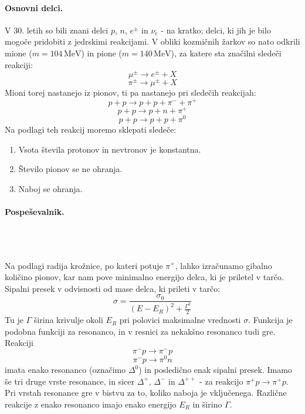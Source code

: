 \documentclass[a4paper]{article}
\newcommand{\vct}[1]{\overrightarrow{#1}}
\begin{document}
\paragraph{Osnovni delci.} V 30. letih so bili znani delci \(p\), \(n\), \(e^\pm\) in \(\nu_e\) - na kratko; delci, ki jih je bilo mogoče pridobiti z jedrskimi reakcijami.
V obliki kozmičnih žarkov so nato odkrili mione (\(m = 104\,\mathrm{MeV}\)) in pione (\(m = 140\,\mathrm{MeV}\)), za katere sta značilni sledeči reakciji:
\[\mu^\pm \to e^\pm + X\]
\[\pi^\pm \to \mu^\pm + X\]
Mioni torej nastanejo iz pionov, ti pa nastanejo pri sledečih reakcijah:
\[p + p \to p + p + \pi^- + \pi^+\]
\[p + p \to p + n + \pi^+\]
\[p + p \to p + p + \pi^0\]
Na podlagi teh reakcij moremo sklepati sledeče:
\begin{enumerate}
    \item Vsota števila protonov in nevtronov je konstantna.
    \item Število pionov se ne ohranja.
    \item Naboj se ohranja.
\end{enumerate}
\paragraph{Pospeševalnik.} \text{} \\
\begin{figure}[h!]
    \centering
\end{figure} \\
Na podlagi radija krožnice, po kateri potuje \(\pi^+\),
lahko izračunamo gibalno količino pionov, kar nam pove minimalno energijo delca, ki je priletel v tarčo.
Sipalni presek v odvisnosti od mase delca, ki prileti v tarčo:
\[\sigma = \frac{\sigma_0}{(E-E_R)^2 + \frac{\Gamma^2}{2}}\]
Tu je \(\Gamma\) širina krivulje okoli \(E_R\) pri polovici maksimalne vrednosti \(\sigma\). Funkcija je podobna funkciji za resonanco, in v resnici za nekakšno resonanco tudi gre. \\
Reakciji
\[\pi^- p \to \pi^- p\]
\[\pi^- p \to \pi^0 n\]
imata enako resonanco (označimo \(\Delta^0\)) in posledično enak sipalni presek.
Imamo še tri druge vrste resonance, in sicer \(\Delta^+\), \(\Delta^-\) in \(\Delta^{++}\) - za reakcijo \(\pi^+ p \to \pi^+ p\).
Pri vrstah resonance gre v bistvu za to, koliko naboja je vključenega. Različne reakcije z enako resonanco imajo enako energijo \(E_R\) in širino \(\Gamma\).
\end{document}
